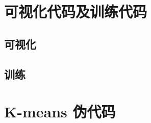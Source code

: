 \section{可视化代码及训练代码}
    \subsection{可视化}
        
    \subsection{训练}
        

\section{K-means 伪代码}
    